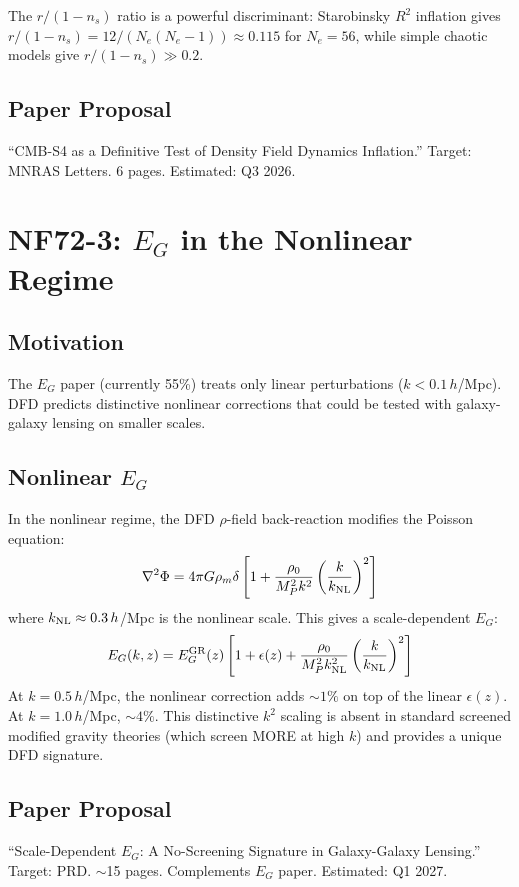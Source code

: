 \documentclass[11pt,a4paper]{article}
\begin{document}
The $r/(1-n_s)$ ratio is a powerful discriminant: Starobinsky $R^2$ inflation gives $r/(1-n_s) = 12/(N_e(N_e-1)) \approx 0.115$ for $N_e = 56$, while simple chaotic models give $r/(1-n_s) \gg 0.2$.

\subsection{Paper Proposal}
``CMB-S4 as a Definitive Test of Density Field Dynamics Inflation.'' Target: MNRAS Letters. 6 pages. Estimated: Q3 2026.

\section{NF72-3: $E_G$ in the Nonlinear Regime}

\subsection{Motivation}
The $E_G$ paper (currently 55\%) treats only linear perturbations ($k < 0.1\,h$/Mpc). DFD predicts distinctive nonlinear corrections that could be tested with galaxy-galaxy lensing on smaller scales.

\subsection{Nonlinear $E_G$}
In the nonlinear regime, the DFD $\rho$-field back-reaction modifies the Poisson equation:
\[
\nabla^2 \Phi = 4\pi G \rho_m \delta\left[1 + \frac{\rho_0}{M_P^2 k^2}\left(\frac{k}{k_{\rm NL}}\right)^2\right]
\]
where $k_{\rm NL} \approx 0.3\,h$/Mpc is the nonlinear scale. This gives a scale-dependent $E_G$:
\[
E_G(k, z) = E_G^{\rm GR}(z)\left[1 + \epsilon(z) + \frac{\rho_0}{M_P^2 k_{\rm NL}^2}\left(\frac{k}{k_{\rm NL}}\right)^2\right]
\]
At $k = 0.5\,h$/Mpc, the nonlinear correction adds $\sim 1\%$ on top of the linear $\epsilon(z)$. At $k = 1.0\,h$/Mpc, $\sim 4\%$. This distinctive $k^2$ scaling is absent in standard screened modified gravity theories (which screen MORE at high $k$) and provides a unique DFD signature.

\subsection{Paper Proposal}
``Scale-Dependent $E_G$: A No-Screening Signature in Galaxy-Galaxy Lensing.'' Target: PRD. $\sim$15 pages. Complements $E_G$ paper. Estimated: Q1 2027.
\end{document}
